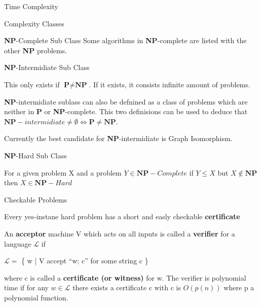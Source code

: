 \documentclass[12pt, letterpaper]{article}
\begin{document}
\begin{section}{Time Complexity}
\begin{subsection}{Complexity Classes}
\begin{subsubsection}{\textbf{NP}-Complete Sub Class}
      Some algorithms in \textbf{NP}-complete are listed with the other
      \textbf{NP} problems.

    \end{subsubsection}

    \begin{subsubsection}{\textbf{NP}-Intermidiate Sub Class}

      This only exists if \(\textbf{P} \neq \textbf{NP}\).
      If it exists, it consists infinite amount of problems.

      \textbf{NP}-intermidiate sublass can also be defnined as a class of
      problems which are neither in \textbf{P} or \textbf{NP}-complete.
      This two definisions can be used to deduce that
      \(\textbf{NP}-intermidiate \neq \emptyset \iff \textbf{P} \neq \textbf{NP}\).

      Currently the best candidate for \textbf{NP}-intermidiate is Graph Isomorphism.

    \end{subsubsection}

    \begin{subsubsection}{\textbf{NP}-Hard Sub Class}

      For a given problem X and a problem \(Y \in \textbf{NP}-Complete\) if
      \(Y \leq X\) but \(X \notin \textbf{NP}\) then \(X \in \textbf{NP}-Hard\)

    \end{subsubsection}

  \end{subsection}

  \begin{subsection}{Checkable Problems}

    Every yes-instane hard problem has a short and easly checkable \textbf{certificate}

    An \textbf{acceptor} machine V which acts on all inputs is called a \textbf{verifier}
    for a language \(\mathscr{L}\) if
    \begin{center}
      \(\mathscr{L} = \) \{{} w | V accept ``w; c'' for some string c \}{}
    \end{center}
    where c is called a \textbf{certificate (or witness)} for w. The verifier is
    polynomial time if for any \(w \in \mathscr{L}\) there exists a certificate
    c with c is \(O(p(n))\) where p a polynomial function.

  \end{subsection}

\end{section}
\end{document}
